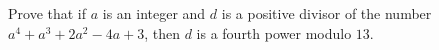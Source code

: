 Prove that if $a$ is an integer and $d$ is a positive divisor of the number $a^4+a^3+2a^2-4a+3$, then $d$ is a fourth power modulo $13$.